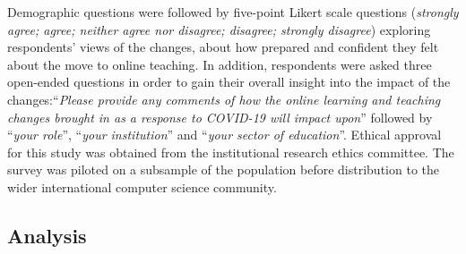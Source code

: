 \documentclass[conference]{IEEEtran}
\begin{document}

Demographic questions were followed by five-point Likert scale
questions ({\emph{strongly agree; agree; neither agree nor disagree;
disagree; strongly disagree}}) exploring respondents' views of the
changes, about how prepared and confident they felt about the move to
online teaching. In addition, respondents were asked three open-ended
questions in order to gain their overall insight into the impact of
the changes:``{\emph{Please provide any comments of how the online
learning and teaching changes brought in as a response to COVID-19
will impact upon}}'' followed by ``{\emph{your role}}'', ``{\emph{your
institution}}'' and ``{\emph{your sector of education}}''. Ethical
approval for this study was obtained from the institutional research
ethics committee. The survey was piloted on a subsample of the
population before distribution to the wider international computer
science community.


\subsection{Analysis}

\end{document}
